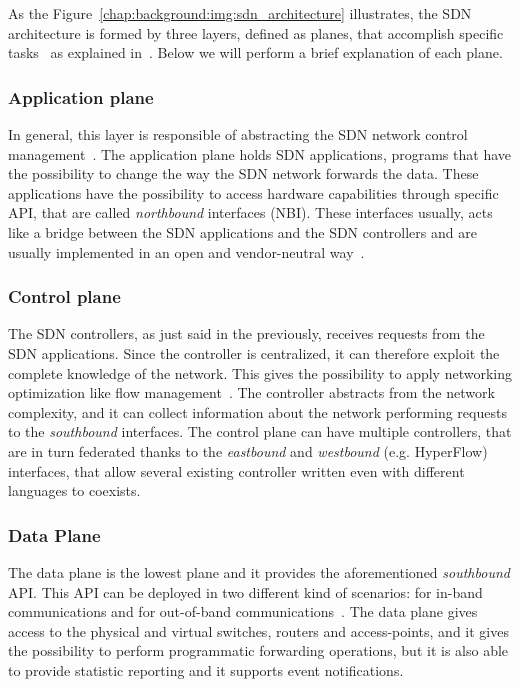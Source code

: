 As the Figure~\ref{chap:background:img:sdn_architecture} illustrates, the SDN
architecture is formed by three layers, defined as planes, that accomplish
specific tasks~\cite{fundation2012software} as explained
in~\cite{fundation2013software}. Below we will perform a brief explanation of
each plane.

\subsubsection{Application plane}
In general, this layer is responsible of abstracting the SDN network control
management~\cite{benzekki2016software}. The application plane holds SDN
applications, programs that have the possibility to change the way the SDN
network forwards the data. These applications have the possibility to access
hardware capabilities through specific API, that are called \emph{northbound}
interfaces (NBI). These interfaces usually, acts like a bridge between the SDN
applications and the SDN controllers and are usually implemented in an open and
vendor-neutral way~\cite{fundation2013software}.

\subsubsection{Control plane}
\label{chap:background:sec:sdn:sub:cp}
The SDN controllers, as just said in the previously, receives requests from the
SDN applications. Since the controller is centralized, it can therefore exploit
the complete knowledge of the network. This gives the possibility to apply
networking optimization like flow management~\cite{sezer2013we}. The controller
abstracts from the network complexity, and it can collect information about the
network performing requests to the \emph{southbound} interfaces. The control
plane can have multiple controllers, that are in turn federated thanks to the
\emph{eastbound} and \emph{westbound} (e.g.
HyperFlow)~\cite{benzekki2016software} interfaces, that allow several existing
controller written even with different languages to coexists.

\subsubsection{Data Plane}
The data plane is the lowest plane and it provides the aforementioned
\emph{southbound} API. This API can be deployed in two different kind of
scenarios: for in-band communications and for out-of-band
communications~\cite{benzekki2016software}. The data plane gives access to the
physical and virtual switches, routers and access-points, and it gives the
possibility to perform programmatic forwarding operations, but it is also able
to provide statistic reporting and it supports event notifications.

